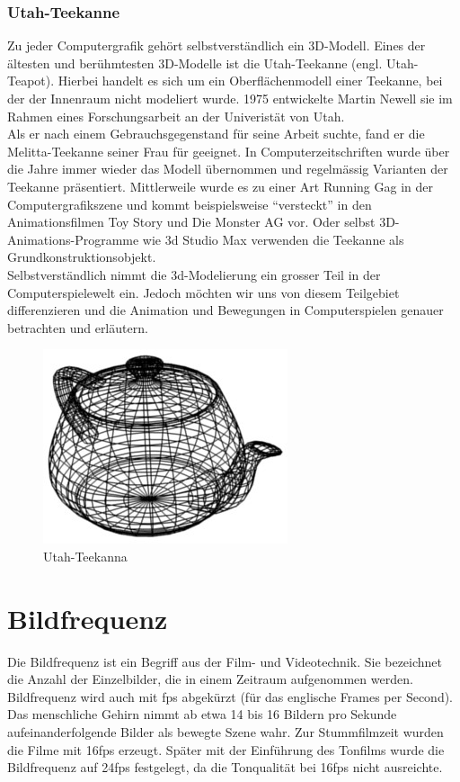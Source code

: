 \subsubsection{Utah-Teekanne}

Zu jeder Computergrafik gehört selbstverständlich ein 3D-Modell. Eines der ältesten und berühmtesten 3D-Modelle ist die Utah-Teekanne (engl. Utah-Teapot). Hierbei handelt es sich um ein Oberflächenmodell einer Teekanne, bei der der Innenraum nicht modeliert wurde. 1975 entwickelte Martin Newell sie im Rahmen eines Forschungsarbeit an der Univeristät von Utah. \\
Als er nach einem Gebrauchsgegenstand für seine Arbeit suchte, fand er die Melitta-Teekanne seiner Frau für geeignet. In Computerzeitschriften wurde über die Jahre immer wieder das Modell übernommen und regelmässig Varianten der Teekanne präsentiert. Mittlerweile wurde es zu einer Art Running Gag in der Computergrafikszene und kommt beispielsweise ``versteckt'' in den Animationsfilmen Toy Story und Die Monster AG vor. Oder selbst 3D-Animations-Programme wie 3d Studio Max verwenden die Teekanne als Grundkonstruktionsobjekt. \\ 
Selbstverständlich nimmt die 3d-Modelierung ein grosser Teil in der Computerspielewelt ein. Jedoch möchten wir uns von diesem Teilgebiet differenzieren und die Animation und Bewegungen in Computerspielen genauer betrachten und erläutern.

\begin{figure}[htbp]
\center
\includegraphics[scale=0.5]{include/teapot.png}
\caption{Utah-Teekanna}
\end{figure}

\section{Bildfrequenz}
Die Bildfrequenz ist ein Begriff aus der Film- und Videotechnik. Sie bezeichnet die Anzahl der Einzelbilder, die in einem Zeitraum aufgenommen werden. Bildfrequenz wird auch mit fps abgekürzt (für das englische Frames per Second).\\
Das menschliche Gehirn nimmt ab etwa 14 bis 16 Bildern pro Sekunde aufeinanderfolgende Bilder als bewegte Szene wahr.
Zur Stummfilmzeit wurden die Filme mit 16fps erzeugt. Später mit der Einführung des Tonfilms wurde die Bildfrequenz auf 24fps festgelegt, da die Tonqualität bei 16fps nicht ausreichte.

